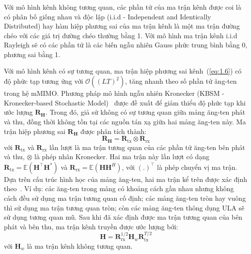 Với mô hình kênh không tương quan, các phần tử của ma trận kênh được coi là có phân bố giống nhau và độc lập (i.i.d - Independent and Identically Distributed) hay hàm hiệp phương sai của ma trận kênh là một ma trận đường chéo với các giá trị đường chéo thường bằng 1. Với mô hình ma trận kênh i.i.d Rayleigh sẽ có các phần tử là các biến ngẫu nhiên Gauss phức trung bình bằng 0, phương sai bằng 1.


 Với mô hình kênh có sự tương quan, ma trận hiệp phương sai kênh~(\ref{eq:1.6}) có độ phức tạp tương ứng với $\mathcal{O}((LT)^2)$, tăng nhanh theo số phần tử ăng-ten trong hệ mMIMO. Phương pháp mô hình ngẫu nhiên Kronecker (KBSM - Kronecker-based Stochastic Model)~\cite{Chuah1998} được đề xuất để giảm thiểu độ phức tạp khi ước lượng $\mathbf{R}_{\mathbf{H}}$. Trong đó, giả sử không có sự tương quan giữa mảng ăng-ten phát và thu, đồng thời không tồn tại các nguồn tán xạ giữa hai mảng ăng-ten này. Ma trận hiệp phương sai $\mathbf{R}_{\mathbf{H}}$ được phân tích thành:
\begin{equation}
    \mathbf{R}_{\mathbf{H}} = \mathbf{R}_{\text{tx}} \otimes \mathbf{R}_{\text{rx}}
\end{equation}
với $\mathbf{R}_{\text{tx}}$ và $\mathbf{R}_{\text{rx}}$ lần lượt là ma trận tương quan của các phần tử ăng-ten bên phát và thu, $\otimes$ là phép nhân Kronecker. Hai ma trận này lần lượt có dạng $\mathbf{R}_{\text{tx}} = \mathbb{E}(\mathbf{H}^\top \mathbf{H}^*)$ và $\mathbf{R}_{\text{rx}} = \mathbb{E}(\mathbf{H} \mathbf{H}^H)$, với $(.)^\top$ là phép chuyển vị ma trận. Dựa trên cấu trúc hình học của mảng ăng-ten, hai ma trận kể trên được xác định theo~\cite{Kshetrimayum2017}. Ví dụ: các ăng-ten trong mảng có khoảng cách gần nhau nhưng không cách đều sử dụng ma trận tương quan cố định; các mảng ăng-ten tròn hay vuông thì sử dụng ma trận tương quan tròn; còn các mảng ăng-ten thông dụng ULA sẽ sử dụng tương quan mũ. Sau khi đã xác định được ma trận tương quan của bên phát và bên thu, ma trận kênh truyền được ước lượng bởi:
\begin{equation}
    \mathbf{H} = \mathbf{R}_{\text{rx}}^{1/2} \mathbf{H}_w \mathbf{R}_{\text{tx}}^{T/2}
\end{equation}
với $\mathbf{H}_w$ là ma trận kênh không tương quan.

